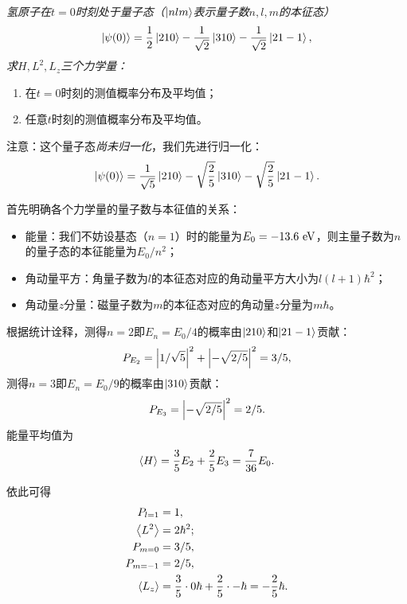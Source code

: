 \begin{tcolorbox}[breakable, title={\textbf{例题：氢原子能级叠加态}}]
    \it\small
    氢原子在$t=0$时刻处于量子态（$\ket{nlm}$表示量子数$n,l,m$的本征态）
    \begin{equation}
        \ket{\psi(0)} = \frac12\ket{210} - \frac{1}{\sqrt{2}}\ket{310} - \frac{1}{\sqrt{2}}\ket{21-1},
    \end{equation}
    求$H, L^2, L_z$三个力学量：
    \begin{enumerate}
        \item{在$t=0$时刻的测值概率分布及平均值；}
        \item{任意$t$时刻的测值概率分布及平均值。}
    \end{enumerate}


    注意：这个量子态\emph{尚未归一化}，我们先进行归一化：
    \begin{equation}
        \ket{\psi(0)} = \frac{1}{\sqrt{5}}\ket{210} - \sqrt{\frac25}\ket{310} - \sqrt{\frac25}\ket{21-1}.
    \end{equation}

    首先明确各个力学量的量子数与本征值的关系：
    \begin{itemize}
        \item{能量：我们不妨设基态（$n=1$）时的能量为$E_0=-13.6\ \rm{eV}$，则主量子数为$n$的量子态的本征能量为$E_0/n^2$；}
        \item{角动量平方：角量子数为$l$的本征态对应的角动量平方大小为$l(l+1)\hbar^2$；}
        \item{角动量$z$分量：磁量子数为$m$的本征态对应的角动量$z$分量为$m\hbar$。}
    \end{itemize}

    根据统计诠释，测得$n=2$即$E_n=E_0/4$的概率由$\ket{210}$和$\ket{21-1}$贡献：
    \begin{equation}
        P_{E_2} = \abs{1/\sqrt{5}}^2 + \abs{-\sqrt{2/5}}^2 = 3/5,
    \end{equation}
    测得$n=3$即$E_n=E_0/9$的概率由$\ket{310}$贡献：
    \begin{equation}
        P_{E_3} = \abs{-\sqrt{2/5}}^2 = 2/5.
    \end{equation}
    能量平均值为
    \begin{equation}
        \expval{H} = \frac35 E_2 + \frac25 E_3 = \frac{7}{36} E_0.
    \end{equation}

    依此可得
    \begin{equation}
    \begin{aligned}
        P_{l=1} &= 1, \\
        \expval{L^2} &= 2\hbar^2; \\
        P_{m=0} &= 3/5, \\
        P_{m=-1} &= 2/5, \\
        \expval{L_z} &= \frac35 \cdot 0\hbar + \frac25 \cdot -\hbar = -\frac25\hbar.
    \end{aligned}
    \end{equation}


\end{tcolorbox}
